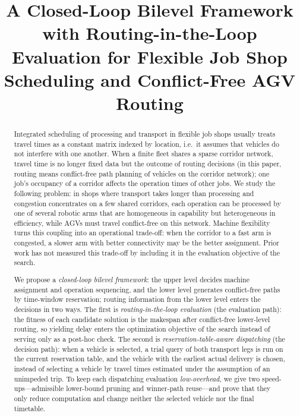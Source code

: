 \documentclass[manuscript,screen,review]{acmart}
\newcommand{\GainProbeLoop}{2.45\%}      %
\begin{document}
\title[Closed-Loop Bilevel Framework with Routing-in-the-Loop Evaluation]{A Closed-Loop Bilevel Framework with Routing-in-the-Loop Evaluation for Flexible Job Shop Scheduling and Conflict-Free AGV Routing}


\begin{abstract}
Integrated scheduling of processing and transport in flexible job shops usually treats travel times as a constant matrix indexed by location, i.e.\ it assumes that vehicles do not interfere with one another.
When a finite fleet shares a sparse corridor network, travel time is no longer fixed data but the outcome of routing decisions (in this paper, routing means conflict-free path planning of vehicles on the corridor network); one job's occupancy of a corridor affects the operation times of other jobs.
We study the following problem: in shops where transport takes longer than processing and congestion concentrates on a few shared corridors, each operation can be processed by one of several robotic arms that are homogeneous in capability but heterogeneous in efficiency, while AGVs must travel conflict-free on this network.
Machine flexibility turns this coupling into an operational trade-off: when the corridor to a fast arm is congested, a slower arm with better connectivity may be the better assignment. Prior work has not measured this trade-off by including it in the evaluation objective of the search.

We propose a \emph{closed-loop bilevel framework}: the upper level decides machine assignment and operation sequencing, and the lower level generates conflict-free paths by time-window reservation; routing information from the lower level enters the decisions in two ways.
The first is \emph{routing-in-the-loop evaluation} (the evaluation path): the fitness of each candidate solution is the makespan after conflict-free lower-level routing, so yielding delay enters the optimization objective of the search instead of serving only as a post-hoc check.
The second is \emph{reservation-table-aware dispatching} (the decision path): when a vehicle is selected, a trial query of both transport legs is run on the current reservation table, and the vehicle with the earliest actual delivery is chosen, instead of selecting a vehicle by travel times estimated under the assumption of an unimpeded trip.
To keep each dispatching evaluation \emph{low-overhead}, we give two speed-ups---admissible lower-bound pruning and winner-path reuse---and prove that they only reduce computation and change neither the selected vehicle nor the final timetable.


\end{abstract}
\end{document}
